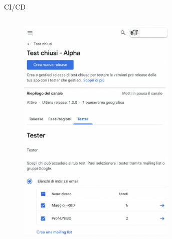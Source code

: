     \begin{frame}{CI/CD}
        \begin{columns}[onlytextwidth]
            \begin{column}{0.5\textwidth}
                \begin{figure}[H]
                \centering
                \includegraphics[width=0.8\textwidth]{img/Screenshot 2022-09-28 at 14.41.54.png}
                \end{figure}
            \end{column}
            \begin{column}{0.5\textwidth}
                \begin{figure}[H]
                \centering

\end{figure}
\end{column}
\end{columns}
\end{frame}
